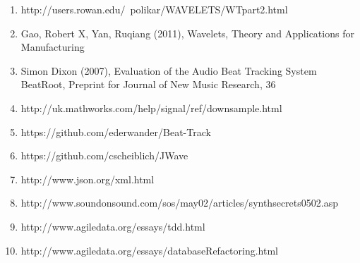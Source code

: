 \documentclass[a4paper, 11pt]{article}
\begin{document}
\begin{enumerate}
\item http://users.rowan.edu/~polikar/WAVELETS/WTpart2.html %
\item Gao, Robert X, Yan, Ruqiang (2011), Wavelets, Theory and Applications for Manufacturing %
\item Simon Dixon (2007), Evaluation of the Audio Beat Tracking System BeatRoot, Preprint for Journal of New Music Research, 36 %
\item http://uk.mathworks.com/help/signal/ref/downsample.html
\item https://github.com/ederwander/Beat-Track %
\item https://github.com/cscheiblich/JWave
\item http://www.json.org/xml.html %
\item http://www.soundonsound.com/sos/may02/articles/synthsecrets0502.asp
\item http://www.agiledata.org/essays/tdd.html
\item http://www.agiledata.org/essays/databaseRefactoring.html








\end{enumerate}
\end{document}
